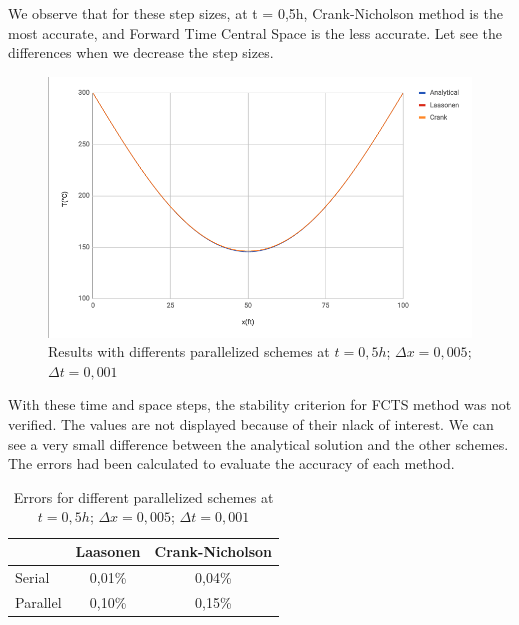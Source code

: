 \documentclass{article}
\begin{document}
                We observe that for these step sizes, at t = 0,5h, Crank-Nicholson method is the 
                most accurate, and Forward Time Central Space is the less accurate. Let see the 
                differences when we decrease the step sizes.

                \begin{figure}[H]
                    \includegraphics[width=\textwidth]{step_size_2.png}
                    \caption{Results with differents parallelized schemes at $t = 0,5h$; $\Delta x=0,005$; $\Delta t=0,001$}
                \end{figure}

                With these time and space steps, the stability criterion for FCTS method was not 
                verified. The values are not displayed because of their nlack of interest.
                We can see a very small difference between the analytical solution and the other schemes. The errors had been calculated 
                to evaluate the accuracy of each method.

                \begin{table}[H]
                    \centering
                    \caption{Errors for different parallelized schemes at $t = 0,5h$; $\Delta x=0,005$; $\Delta t=0,001$}
                    \begin{tabular}{|l|c|c|}
                        \hline
                                 & \multicolumn{1}{l|}{Laasonen} & \multicolumn{1}{l|}{Crank-Nicholson} \\ \hline
                        Serial   & 0,01\%                        & 0,04\%                               \\ \hline
                        Parallel & 0,10\%                        & 0,15\%                               \\ \hline
                    \end{tabular}
                \end{table}
\end{document}
